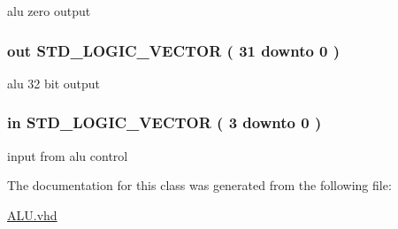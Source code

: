 alu zero output 

\hypertarget{class_a_l_u_a75eaa7827fe89e680e452286e5f64e93}{
\subsubsection[{\-A\-L\-U\-\_\-\-Result}]{ {\bfseries out } {\bfseries \-S\-T\-D\-\_\-\-L\-O\-G\-I\-C\-\_\-\-V\-E\-C\-T\-O\-R (   31    downto    0  ) } }}\label{class_a_l_u_a75eaa7827fe89e680e452286e5f64e93}


alu 32 bit output 

\hypertarget{class_a_l_u_a160e9acd866b7a383a28d77c159bd52a}{
\subsubsection[{\-A\-L\-U\-\_\-\-Control\-\_\-\-In}]{ {\bfseries in } {\bfseries \-S\-T\-D\-\_\-\-L\-O\-G\-I\-C\-\_\-\-V\-E\-C\-T\-O\-R (   3    downto    0  ) } }}\label{class_a_l_u_a160e9acd866b7a383a28d77c159bd52a}


input from alu control 



\-The documentation for this class was generated from the following file\-:\begin{DoxyCompactItemize}
\item 
\hyperlink{_a_l_u_8vhd}{\-A\-L\-U.\-vhd}\end{DoxyCompactItemize}
